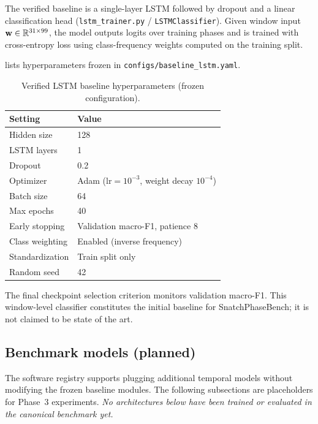 The verified baseline is a single-layer \acs{LSTM} followed by dropout and a linear classification head (\texttt{lstm\_trainer.py} / \texttt{LSTMClassifier}).
Given window input $\mathbf{w} \in \mathbb{R}^{31 \times 99}$, the model outputs logits over \numclasses{} training phases and is trained with cross-entropy loss using class-frequency weights computed on the training split.

 lists hyperparameters frozen in \texttt{configs/baseline\_lstm.yaml}.

\begin{table}[t]
  \centering
  \caption{Verified \acs{LSTM} baseline hyperparameters (frozen configuration).}
  \label{tab:lstm_hyperparams}
  \begin{tabular}{ll}
    \toprule
    Setting & Value \\
    \midrule
    Hidden size & 128 \\
    \acs{LSTM} layers & 1 \\
    Dropout & 0.2 \\
    Optimizer & Adam ($\mathrm{lr}=10^{-3}$, weight decay $10^{-4}$) \\
    Batch size & 64 \\
    Max epochs & 40 \\
    Early stopping & Validation macro-F1, patience 8 \\
    Class weighting & Enabled (inverse frequency) \\
    Standardization & Train split only \\
    Random seed & 42 \\
    \bottomrule
  \end{tabular}
\end{table}

The final checkpoint selection criterion monitors validation macro-F1.
This window-level classifier constitutes the initial baseline for SnatchPhaseBench; it is not claimed to be state of the art.

\subsection{Benchmark models (planned)}
\label{sec:methods:benchmark}

The software registry supports plugging additional temporal models without modifying the frozen baseline modules.
The following subsections are placeholders for Phase~3 experiments.
\emph{No architectures below have been trained or evaluated in the canonical benchmark yet.}

